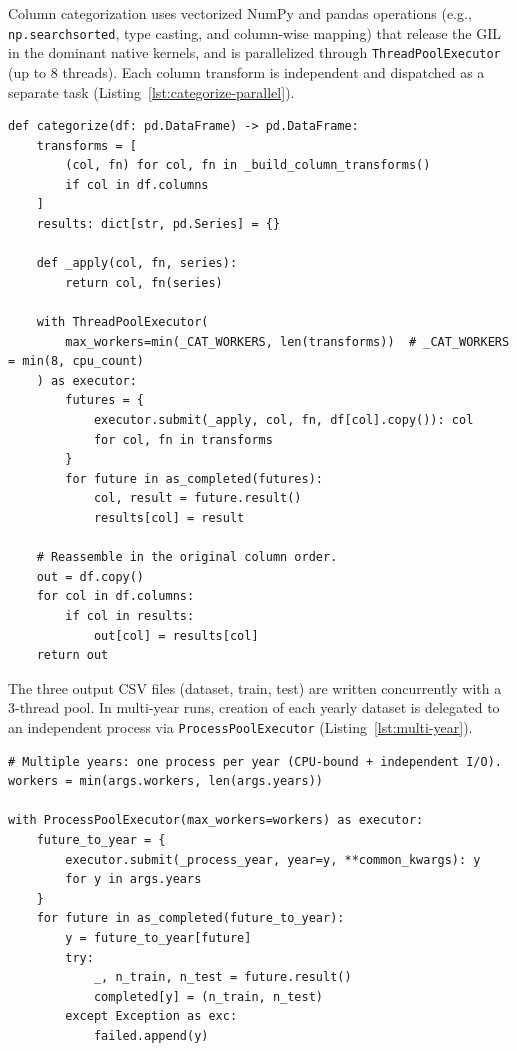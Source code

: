 Column categorization uses vectorized NumPy and pandas operations (e.g., \texttt{np.searchsorted}, type casting, and column-wise mapping) that release the GIL in the dominant native kernels, and is parallelized through \texttt{ThreadPoolExecutor} (up to 8 threads).
Each column transform is independent and dispatched as a separate task (Listing~\ref{lst:categorize-parallel}).

\begin{lstlisting}[style=pipeline,caption={Parallel column categorization (\texttt{src/create\_dataset.py}).},label={lst:categorize-parallel}]
def categorize(df: pd.DataFrame) -> pd.DataFrame:
    transforms = [
        (col, fn) for col, fn in _build_column_transforms()
        if col in df.columns
    ]
    results: dict[str, pd.Series] = {}

    def _apply(col, fn, series):
        return col, fn(series)

    with ThreadPoolExecutor(
        max_workers=min(_CAT_WORKERS, len(transforms))  # _CAT_WORKERS = min(8, cpu_count)
    ) as executor:
        futures = {
            executor.submit(_apply, col, fn, df[col].copy()): col
            for col, fn in transforms
        }
        for future in as_completed(futures):
            col, result = future.result()
            results[col] = result

    # Reassemble in the original column order.
    out = df.copy()
    for col in df.columns:
        if col in results:
            out[col] = results[col]
    return out
\end{lstlisting}

The three output CSV files (dataset, train, test) are written concurrently with a 3-thread pool.
In multi-year runs, creation of each yearly dataset is delegated to an independent process via \texttt{ProcessPoolExecutor} (Listing~\ref{lst:multi-year}).

\begin{lstlisting}[style=pipeline,caption={Multi-year parallel execution via \texttt{ProcessPoolExecutor} (\texttt{src/main.py}).},label={lst:multi-year}]
# Multiple years: one process per year (CPU-bound + independent I/O).
workers = min(args.workers, len(args.years))

with ProcessPoolExecutor(max_workers=workers) as executor:
    future_to_year = {
        executor.submit(_process_year, year=y, **common_kwargs): y
        for y in args.years
    }
    for future in as_completed(future_to_year):
        y = future_to_year[future]
        try:
            _, n_train, n_test = future.result()
            completed[y] = (n_train, n_test)
        except Exception as exc:
            failed.append(y)
\end{lstlisting}

